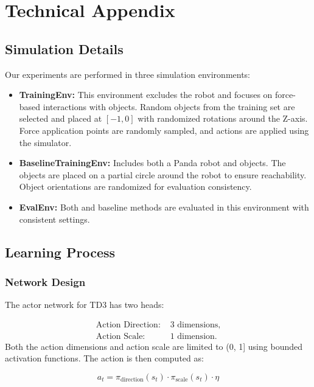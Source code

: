 \section{Technical Appendix}
\label{sec:flex_technical_appendix}

\subsection{Simulation Details}

Our experiments are performed in three simulation environments:

\begin{itemize}
    \item \textbf{TrainingEnv:} This environment excludes the robot and focuses on force-based interactions with objects. Random objects from the training set are selected and placed at \([-1, 0]\) with randomized rotations around the Z-axis. Force application points are randomly sampled, and actions are applied using the simulator. 
    \item \textbf{BaselineTrainingEnv:} Includes both a Panda robot and objects. The objects are placed on a partial circle around the robot to ensure reachability. Object orientations are randomized for evaluation consistency.
    \item \textbf{EvalEnv:} Both \FLEX{} and baseline methods are evaluated in this environment with consistent settings.
\end{itemize}

\subsection{Learning Process}

\subsubsection{Network Design}
The actor network for TD3 has two heads:

\[
\begin{aligned}
\text{Action Direction: } & \text{3 dimensions}, \\
\text{Action Scale: } & \text{1 dimension}.
\end{aligned}
\]
Both the action dimensions and action scale are limited to (0, 1] using bounded activation functions.
The action is then computed as:

\[
a_t = \pi_{\text{direction}}(s_t) \cdot \pi_{\text{scale}}(s_t) \cdot \eta
\]

